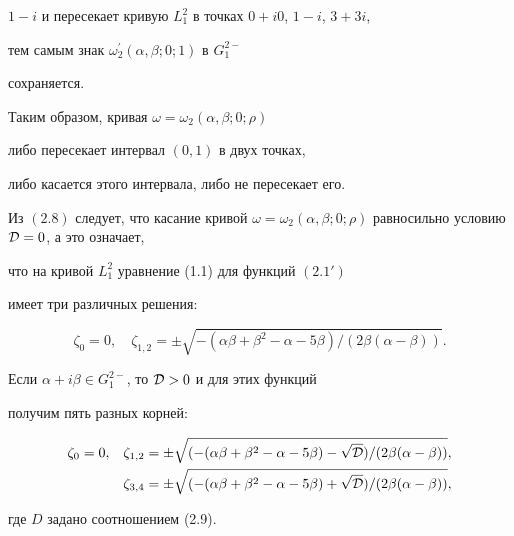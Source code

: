 $1-i$ и пересекает кривую $L_1^2$ в точках $0+i0$, $1-i$, $3+3i$,


тем самым знак $\omega_2^\prime(\alpha,\beta;0;1)$ в $G_1^{2-}$


сохраняется.





Таким образом, кривая $\omega=\omega_2(\alpha,\beta;0;\rho)$


либо пересекает интервал $(0,1)$ в двух точках,


либо касается этого интервала, либо не пересекает его.





Из $(2.8)$ следует, что касание кривой $\omega=\omega_2


(\alpha,\beta;0;\rho)$ равносильно условию ${\cal D}=0$, а это означает,


что на кривой $L_1^2$ уравнение (1.1) для функций $(2.1')$


имеет три различных решения:


\begin{equation}


\zeta_0=0,\quad \zeta_{1,2}=\pm\sqrt{-(\alpha\beta+\beta^2-


\alpha-5\beta)/(2\beta(\alpha-\beta))}.


\end{equation}


Если $\alpha+i\beta\in G_1^{2-}$, то ${\cal D}>0$ и для этих функций


получим пять разных корней:


\begin{equation}


\begin{split}


\zeta_0=0, \quad &\zeta_{1,2}=\pm\sqrt{(-(\alpha\beta+\beta^2-


\alpha-5\beta)-\sqrt{\cal D})/(2\beta(\alpha-\beta))},\\


%


&\zeta_{3,4}=\pm\sqrt{(-(\alpha\beta+\beta^2-\alpha-5\beta)+


\sqrt{\cal D})/(2\beta(\alpha-\beta))},


\end{split}


\end{equation}


где $D$ задано соотношением (2.9).






